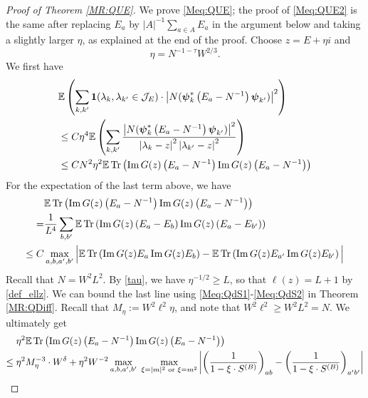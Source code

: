 \begin{proof}[Proof of Theorem \ref{MR:QUE}]  
We prove \eqref{Meq:QUE}; the proof of \eqref{Meq:QUE2} is the same after replacing $E_{a}$ by $|A|^{-1}\sum_{a\in A}E_{a}$ in the argument below and taking a slightly larger $\eta$, as explained at the end of the proof. Choose  $  z=E+\eta i$ and $$\eta= N^{-1-\tau }{W^{2/3}}.$$
We first have
\begin{align}\label{ssfa2}
& \mathbb{E}\left(\sum_{k,k'} \textbf{1}(\lambda_k,\lambda_{k'}\in {\cal J}_E)\cdot \left|N(\boldsymbol{\psi}_{k}^*\left(E_a-N^{-1}\right) \boldsymbol{\psi}_{k'})\right|^2\right) \nonumber \\
& 
\le C \eta^4 \mathbb{E}\left(\sum_{k,k'  } \frac{\left|N(\boldsymbol{\psi}_{k}^*\left(E_a-N^{-1}\right) \boldsymbol{\psi}_{k'})\right|^2}{\left|\lambda_k-z\right|^2\left|\lambda_{k'}-z\right|^2}\right)\\\nonumber
& \le 
 C N^{2}\eta^2\mathbb{E}\operatorname{Tr} \left(\operatorname{Im} G(z)\left(E_a-N^{-1}\right) \operatorname{Im} G(z)\left(E_a-N^{-1}\right)\right)
\end{align}
For the expectation of the last term above, we have
\begin{align}\label{que0} 
 &\mathbb{E}  \operatorname{Tr} \left(\operatorname{Im} G(z)\left(E_a-N^{-1}\right) \operatorname{Im} G(z)\left(E_a-N^{-1}\right)\right)
  \\ 
=&\frac{1}{L^4}\sum_{b,b'}
\mathbb{E}  
 \operatorname{Tr} \left(\operatorname{Im} G(z)\left(E_a-E_b\right) \operatorname{Im} G(z)\left(E_a-E_{b'}\right)\right)
\nonumber \\ \nonumber
\le C&\max_{a,b,a',b'}
\Big|\mathbb{E}\operatorname{Tr} \left(\operatorname{Im} G(z) E_a  \operatorname{Im} G(z)E_b \right)
-\mathbb{E}\operatorname{Tr} \left(\operatorname{Im} G(z) E_{a'}  \operatorname{Im} G(z)E_{b'}\right) \Big| 
\end{align}
Recall that $N=W^{2}L^{2}$. By \eqref{tau},    we have $ \eta^{-1/2} \ge L$, so that $\ell(z)=L+1$ by \eqref{def_ellz}. We can bound the last line using \eqref{Meq:QdS1}-\eqref{Meq:QdS2} in Theorem \ref{MR:QDiff}. Recall that $M_{\eta}:=W^{2}\ell^{2}\eta$, and note that $W^{2}\ell^{2}\geq W^{2}L^{2}=N$. We ultimately get
 \begin{align}
 \;& \eta^2 \mathbb{E}  \tr \left(\operatorname{Im} G(z)\left(E_a-N^{-1}\right) \operatorname{Im} G(z)\left(E_a-N^{-1}\right)\right)
\nonumber \\
\le \;& \eta^2 M_{\eta}^{-3}\cdot W^{\delta} + \eta^2 W^{-2}\max_{a,b,a',b'}\;\max_{ \xi=|m|^2 \text{ or } \xi=m^2}
\left| \left(\frac{1}{1-\xi\cdot S^{(B)}}\right)_{ab}-\left(\frac{1}{1-\xi\cdot S^{(B)}}\right)_{a'b'}\right|

\end{align}
\end{proof}
